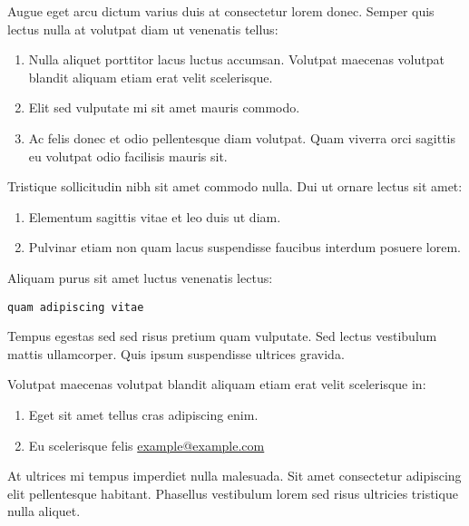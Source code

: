 \documentclass[9pt]{innovativeinnovation-cheatsheet}
\begin{document}
\begin{multicols*}{3}
Augue eget arcu dictum varius duis at consectetur lorem donec. Semper quis
lectus nulla at volutpat diam ut venenatis tellus:

\begin{enumerate}
  \item Nulla aliquet porttitor lacus luctus accumsan. Volutpat maecenas
        volutpat blandit aliquam etiam erat velit scelerisque.
  \item Elit sed vulputate mi sit amet mauris commodo.
  \item Ac felis donec et odio pellentesque diam volutpat. Quam viverra orci
        sagittis eu volutpat odio facilisis mauris sit.
\end{enumerate}


Tristique sollicitudin nibh sit amet commodo nulla. Dui ut ornare lectus
sit amet:

\begin{enumerate}
  \item Elementum sagittis vitae et leo duis ut diam.
  \item Pulvinar etiam non quam lacus suspendisse faucibus interdum posuere
        lorem.
\end{enumerate}

Aliquam purus sit amet luctus venenatis lectus:

\begin{lstlisting}
quam adipiscing vitae
\end{lstlisting}


 Tempus egestas sed sed risus pretium quam vulputate. Sed lectus vestibulum
 mattis ullamcorper. Quis ipsum suspendisse ultrices gravida.

Volutpat maecenas volutpat blandit aliquam etiam erat velit scelerisque in:

\begin{enumerate}
  \item Eget sit amet tellus cras adipiscing enim.
  \item Eu scelerisque felis
        \href{mailto://example@example.com}{example@example.com}
\end{enumerate}


At ultrices mi tempus imperdiet nulla malesuada. Sit amet consectetur
adipiscing elit pellentesque habitant. Phasellus vestibulum lorem sed risus
ultricies tristique nulla aliquet.


\end{multicols*}
\end{document}
